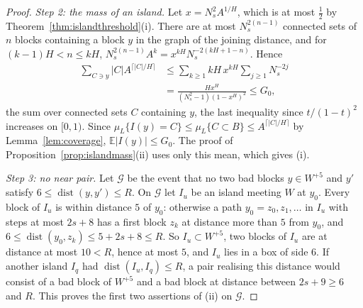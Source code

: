 \documentclass[11pt]{amsart}
\theoremstyle{definition}
\theoremstyle{remark}
\numberwithin{equation}{section}
\newcommand{\E}{\mathbb{E}}
\newcommand{\dist}{\operatorname{dist}}
\begin{document}
\begin{proof}
\emph{Step 2: the mass of an island.} Let $x=N_s^2A^{1/H}$, which is at
most $\frac12$ by Theorem~\ref{thm:islandthreshold}(i). There are at most
$N_s^{2(n-1)}$ connected sets of $n$ blocks containing a block $y$ in the
graph of the joining distance, and for $(k-1)H<n\le kH$,
$N_s^{2(n-1)}A^k=x^{kH}N_s^{-2(kH+1-n)}$. Hence
\begin{equation}\label{eq:islandmassG}
\begin{split}
\sum_{C\ni y}\lvert C\rvert A^{\lceil\lvert C\rvert/H\rceil}&\le
\sum_{k\ge1}kH\,x^{kH}\sum_{j\ge1}N_s^{-2j}\\
&=\frac{Hx^H}{(N_s^2-1)(1-x^H)^2}\le G_0 ,
\end{split}
\end{equation}
the sum over connected sets $C$ containing $y$, the last inequality since
$t/(1-t)^2$ increases on $[0,1)$. Since $\mu_L\{I(y)=C\}\le\mu_L\{C\subset
B\}\le A^{\lceil\lvert C\rvert/H\rceil}$ by Lemma~\ref{lem:coverage},
$\E\lvert I(y)\rvert\le G_0$. The proof of
Proposition~\ref{prop:islandmass}(ii) uses only this mean, which gives (i).

\emph{Step 3: no near pair.} Let $\mathcal G$ be the event that no two
bad blocks $y\in W^{+5}$ and $y'$ satisfy $6\le\dist(y,y')\le R$. On
$\mathcal G$ let $I_u$ be an island meeting $W$ at $y_0$. Every block of
$I_u$ is within distance $5$ of $y_0$: otherwise a path $y_0=z_0,z_1,\dots$
in $I_u$ with steps at most $2s+8$ has a first block $z_k$ at distance more
than $5$ from $y_0$, and $6\le\dist(y_0,z_k)\le5+2s+8\le R$. So
$I_u\subset W^{+5}$, two blocks of $I_u$ are at distance at most $10<R$,
hence at most $5$, and $I_u$ lies in a box of side $6$. If another island
$I_q$ had $\dist(I_u,I_q)\le R$, a pair realising this distance would
consist of a bad block of $W^{+5}$ and a bad block at distance between
$2s+9\ge6$ and $R$. This proves the first two assertions of (ii) on
$\mathcal G$.


\end{proof}
\end{document}
